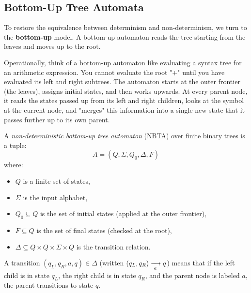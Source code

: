 
\subsection{Bottom-Up Tree Automata}
To restore the equivalence between determinism and non-determinism, we turn to the \textbf{bottom-up} model. A bottom-up automaton reads the tree starting from the leaves and moves up to the root.

Operationally, think of a bottom-up automaton like evaluating a syntax tree for an arithmetic expression. You cannot evaluate the root "+" until you have evaluated its left and right subtrees. The automaton starts at the outer frontier (the leaves), assigns initial states, and then works upwards. At every parent node, it reads the states passed up from its left and right children, looks at the symbol at the current node, and "merges" this information into a single new state that it passes further up to its own parent.

\begin{definition}
A \emph{non-deterministic bottom-up tree automaton} (NBTA) over finite binary trees is a tuple:
$$A = (Q, \Sigma, Q_0, \Delta, F)$$
where:
\begin{itemize}
    \item $Q$ is a finite set of states,
    \item $\Sigma$ is the input alphabet,
    \item $Q_0 \subseteq Q$ is the set of initial states (applied at the outer frontier),
    \item $F \subseteq Q$ is the set of final states (checked at the root),
    \item $\Delta \subseteq Q \times Q \times \Sigma \times Q$ is the transition relation.
\end{itemize}
A transition $(q_L, q_R, a, q) \in \Delta$ (written $(q_L, q_R) \xrightarrow[{\;a\;}]{} q$) means that if the left child is in state $q_L$, the right child is in state $q_R$, and the parent node is labeled $a$, the parent transitions to state $q$.
\end{definition}

